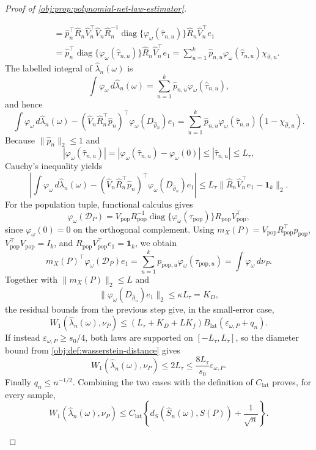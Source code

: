 \documentclass[11pt]{article}
\begin{document}
\begin{proof}[Proof of \cref{obj:prop:polynomial-net-law-estimator}]
\begin{enumerate}
\[\begin{aligned}
&\quad=
\widehat p_n^\top\widehat R_n\widehat V_n^\top
\widehat V_n\widehat R_n^{-1}
\operatorname{diag}\{\varphi_\omega(\widehat\tau_{n,u})\}
\widehat R_n\widehat V_n^\top e_1 \\
&\quad=
\widehat p_n^\top
\operatorname{diag}\{\varphi_\omega(\widehat\tau_{n,u})\}
\widehat R_n\widehat V_n^\top e_1
=
\sum_{u=1}^k\widehat p_{n,u}\varphi_\omega(\widehat\tau_{n,u})\chi_{\widehat\vartheta,u}.
\end{aligned}
\]
The labelled integral of \(\widehat\lambda_n(\omega)\) is
\[
\int\varphi_\omega\,d\widehat\lambda_n(\omega)
=
\sum_{u=1}^k\widehat p_{n,u}\varphi_\omega(\widehat\tau_{n,u}),
\]
and hence
\[
\int\varphi_\omega\,d\widehat\lambda_n(\omega)
-
(\widehat V_n\widehat R_n^\top\widehat p_n)^\top
\varphi_\omega(D_{\widehat\vartheta_n})e_1
=
\sum_{u=1}^k
\widehat p_{n,u}\varphi_\omega(\widehat\tau_{n,u})(1-\chi_{\widehat\vartheta,u}).
\]
Because \(\|\widehat p_n\|_2\le1\) and
\[
|\varphi_\omega(\widehat\tau_{n,u})|
=
|\varphi_\omega(\widehat\tau_{n,u})-\varphi_\omega(0)|
\le|\widehat\tau_{n,u}|
\le L_\tau,
\]
Cauchy's inequality yields
\[
\left|
\int\varphi_\omega\,d\widehat\lambda_n(\omega)
-
(\widehat V_n\widehat R_n^\top\widehat p_n)^\top
\varphi_\omega(D_{\widehat\vartheta_n})e_1
\right|
\le
L_\tau\|\widehat R_n\widehat V_n^\top e_1-\mathbf1_k\|_2 .
\]
For the population tuple, functional calculus gives
\[
\varphi_\omega(\mathcal D_P)
=
V_{\mathrm{pop}}R_{\mathrm{pop}}^{-1}
\operatorname{diag}\{\varphi_\omega(\tau_{\mathrm{pop}})\}
R_{\mathrm{pop}}V_{\mathrm{pop}}^\top ,
\]
since \(\varphi_\omega(0)=0\) on the orthogonal complement.  Using
\(m_X(P)=V_{\mathrm{pop}}R_{\mathrm{pop}}^\top p_{\mathrm{pop}}\),
\(V_{\mathrm{pop}}^\top V_{\mathrm{pop}}=I_k\), and
\(R_{\mathrm{pop}}V_{\mathrm{pop}}^\top e_1=\mathbf1_k\), we obtain
\[
m_X(P)^\top\varphi_\omega(\mathcal D_P)e_1
=
\sum_{u=1}^k p_{\mathrm{pop},u}\varphi_\omega(\tau_{\mathrm{pop},u})
=
\int\varphi_\omega\,d\nu_P .
\]
Together with \(\|m_X(P)\|_2\le L\) and
\[
\|\varphi_\omega(D_{\widehat\vartheta_n})e_1\|_2
\le
\kappa L_\tau
=
K_D,
\]
the residual bounds from the previous step give, in the small-error case,
\[
W_1(\widehat\lambda_n(\omega),\nu_P)
\le
(L_\tau+K_D+LK_f)B_{\mathrm{lat}}(\varepsilon_{\omega,P}+q_n).
\]
If instead \(\varepsilon_{\omega,P}\ge s_0/4\), both laws are supported on
\([-L_\tau,L_\tau]\), so the diameter bound from \cref{obj:def:wasserstein-distance} gives
\[
W_1(\widehat\lambda_n(\omega),\nu_P)
\le2L_\tau
\le\frac{8L_\tau}{s_0}\varepsilon_{\omega,P}.
\]
Finally \(q_n\le n^{-1/2}\).  Combining the two cases with the definition of \(C_{\mathrm{lat}}\) proves, for every sample,
\[
W_1(\widehat\lambda_n(\omega),\nu_P)
\le
C_{\mathrm{lat}}
\left\{
d_S(\widehat S_n(\omega),S(P))+\frac1{\sqrt n}
\right\}.
\] %


\end{enumerate}
\end{proof}
\end{document}
